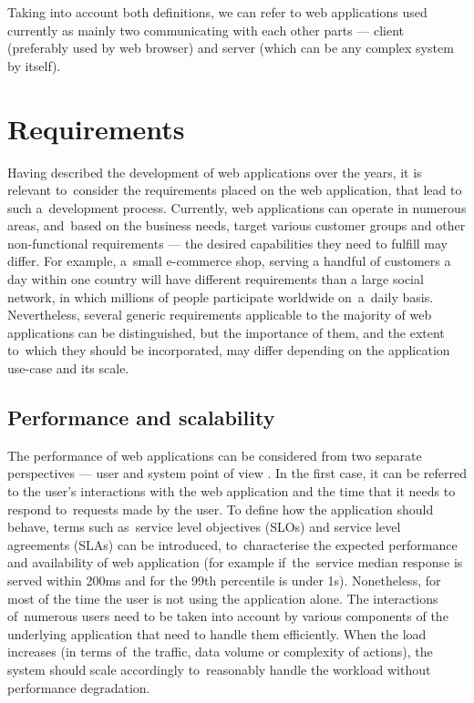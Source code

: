 Taking into account both definitions, we can refer to web applications used currently as mainly two communicating with each other parts --- client (preferably used by web browser) and server (which can be any complex system by itself).

\section{Requirements} \label{chapter:web-apps-requirements}

Having described the development of web applications over the years, it is relevant to~consider the requirements placed on the web application, that lead to such a~development process. Currently, web applications can operate in numerous areas, and~based on the business needs, target various customer groups and other non-functional requirements --- the desired capabilities they need to fulfill may differ. For example, a~small e-commerce shop, serving a handful of customers a day within one country will have different requirements than a large social network, in which millions of people participate worldwide on~a~daily basis. Nevertheless, several generic requirements applicable to the majority of web applications can be distinguished, but the importance of them, and the extent to~which they should be incorporated, may differ depending on the application use-case and its scale.

\subsection{Performance and scalability}

The performance of web applications can be considered from two separate perspectives --- user and system point of view \cite{DesignDataIntensiveApplications}. In the first case, it can be referred to the user's interactions with the web application and the time that it needs to respond to~requests made by the user. To define how the application should behave, terms such as~service level objectives (SLOs) and service level agreements (SLAs) can be introduced, to~characterise the expected performance and availability of web application (for example if~the~service median response is served within 200ms and for the 99th percentile is under 1s). Nonetheless, for most of the time the user is not using the application alone. The interactions of~numerous users need to be taken into account by various components of the underlying application that need to handle them efficiently. When the load increases (in terms of~the traffic, data volume or complexity of actions), the system should scale accordingly to~reasonably handle the workload without performance degradation. 

